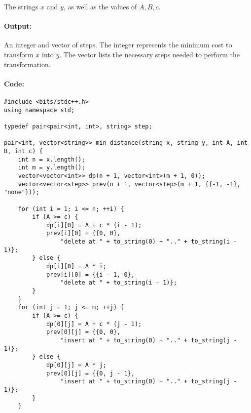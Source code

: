 \documentclass[10pt]{article}
\begin{document}
The strings \(x\) and \(y\), as well as the values of \(A, B, c\). 

\paragraph*{Output:}

An integer and vector of steps. The integer represents the minimum cost to transform \(x\) into \(y\). The vector lists the necessary steps needed to perform the transformation.

\paragraph*{Code:} \hspace*{2mm}
\begin{lstlisting}
#include <bits/stdc++.h>
using namespace std;

typedef pair<pair<int, int>, string> step;

pair<int, vector<string>> min_distance(string x, string y, int A, int B, int c) {
    int n = x.length();
    int m = y.length();
    vector<vector<int>> dp(n + 1, vector<int>(m + 1, 0));
    vector<vector<step>> prev(n + 1, vector<step>(m + 1, {{-1, -1}, "none"}));

    for (int i = 1; i <= n; ++i) {
        if (A >= c) {
            dp[i][0] = A + c * (i - 1);
            prev[i][0] = {{0, 0}, 
                "delete at " + to_string(0) + ".." + to_string(i - 1)};
        } else {
            dp[i][0] = A * i;
            prev[i][0] = {{i - 1, 0}, 
                "delete at " + to_string(i - 1)};
        }
    }
    for (int j = 1; j <= m; ++j) {
        if (A >= c) {
            dp[0][j] = A + c * (j - 1);
            prev[0][j] = {{0, 0}, 
                "insert at " + to_string(0) + ".." + to_string(j - 1)};
        } else {
            dp[0][j] = A * j;
            prev[0][j] = {{0, j - 1}, 
                "insert at " + to_string(0) + ".." + to_string(j - 1)};
        }
    }


\end{lstlisting}
\end{document}
